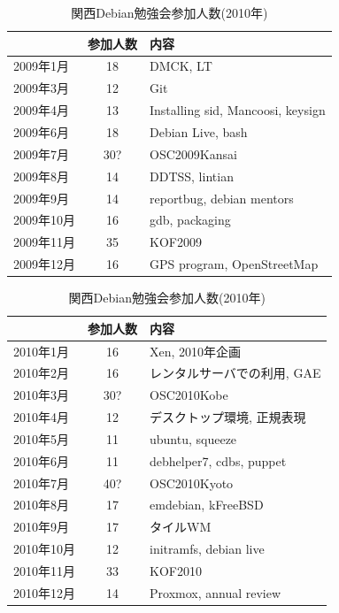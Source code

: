 \documentclass[mingoth,a4paper]{jsarticle}
\begin{document}
\begin{table}[H]
\begin{minipage}{0.5\hsize}
\end{minipage}
\begin{minipage}{0.5\hsize}
 \caption{関西Debian勉強会参加人数(2009年)}\label{tab:count2009kansai}
 \begin{center}
  \begin{tabular}{|l|c|p{10em}|}
 \hline
 & 参加人数 & 内容 \\
 \hline
2009年1月 & 18 & DMCK, LT \\
2009年3月 & 12 & Git \\
2009年4月 & 13 & Installing sid, Mancoosi, keysign \\
2009年6月 & 18 & Debian Live, bash\\
2009年7月 & 30? & OSC2009Kansai \\
2009年8月 & 14 & DDTSS, lintian \\
2009年9月 & 14 & reportbug, debian mentors\\
2009年10月 & 16 & gdb, packaging \\
2009年11月 & 35 & KOF2009 \\
2009年12月 & 16 & GPS program, OpenStreetMap \\
 \hline
  \end{tabular}
 \end{center}
\end{minipage}
\begin{minipage}{0.5\hsize}
 \caption{関西Debian勉強会参加人数(2010年)}\label{tab:count2010kansai}
 \begin{center}
  \begin{tabular}{|l|c|p{10em}|}
 \hline
 & 参加人数 & 内容 \\
 \hline
2010年1月 & 16 & Xen, 2010年企画 \\
2010年2月 & 16 & レンタルサーバでの利用, GAE \\
2010年3月 & 30? & OSC2010Kobe \\
2010年4月 & 12 & デスクトップ環境, 正規表現 \\
2010年5月 & 11 & ubuntu, squeeze \\
2010年6月 & 11 & debhelper7, cdbs, puppet \\
2010年7月 & 40? & OSC2010Kyoto \\
2010年8月 & 17 & emdebian, kFreeBSD \\
2010年9月 & 17 & タイルWM \\
2010年10月 & 12 & initramfs, debian live \\
2010年11月 & 33 & KOF2010 \\
2010年12月 & 14 & Proxmox, annual review \\
 \hline
  \end{tabular}
 \end{center}
\end{minipage}
\end{table}
\end{document}
